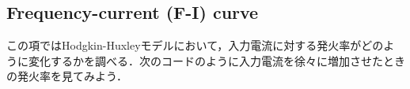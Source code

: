 \subsection{Frequency-current (F-I) curve}この項ではHodgkin-Huxleyモデルにおいて，入力電流に対する発火率がどのように変化するかを調べる．次のコードのように入力電流を徐々に増加させたときの発火率を見てみよう．